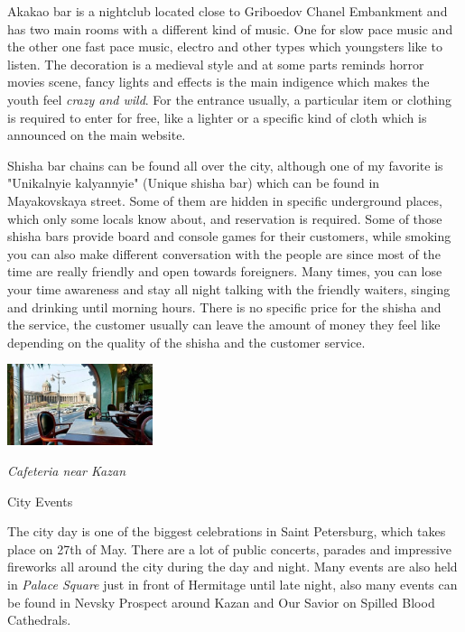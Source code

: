 \documentclass[10pt,a4paper]{article} %
\newcommand{\NewsItem}[1]{ %
\usefont{T1}{fvs}{n}{n} %
\vspace{24pt}\large #1\vspace{3pt} %
\par \normalsize \normalfont}
\begin{document}
\begin{multicols}{3}
Akakao bar is a nightclub located close to Griboedov Chanel Embankment 
and has two main rooms with a different kind of music. 
One for slow pace music and the other one fast pace music, 
electro and other types which youngsters like to listen. 
The decoration is a medieval style and at some parts reminds horror movies scene, 
fancy lights and effects is the main indigence which makes the youth feel 
\textit{crazy and wild}. 
For the entrance usually, a particular item or clothing is required to enter for free, 
like a lighter or a specific kind of cloth which is announced on the main website.

Shisha bar chains can be found all over the city, 
although one of my favorite is "Unikalnyie kalyannyie" (Unique shisha bar) 
which can be found in Mayakovskaya street. 
Some of them are hidden in specific underground places, which only some locals know about, 
and reservation is required. 
Some of those shisha bars provide board and console games for their customers, 
while smoking you can also make different conversation with the people 
are since most of the time are really friendly and open towards foreigners. 
Many times, you can lose your time awareness and stay all night talking with the friendly waiters, 
singing and drinking until morning hours. 
There is no specific price for the shisha and the service, 
the customer usually can leave the amount of money they feel like depending 
on the quality of the shisha and the customer service.

\begin{center}
	\includegraphics[width=0.32\textwidth]{media/cafe.jpg}
	\par\textit{Cafeteria near Kazan}
\end{center}

\NewsItem{City Events}
The city day is one of the biggest celebrations in Saint Petersburg, 
which takes place on 27th of May. 
There are a lot of public concerts, parades and impressive fireworks all around 
the city during the day and night. 
Many events are also held in \textit{Palace Square} just in front of Hermitage 
until late night, also many events can be found in Nevsky Prospect 
around Kazan and Our Savior on Spilled Blood Cathedrals.


\end{multicols}
\end{document}
